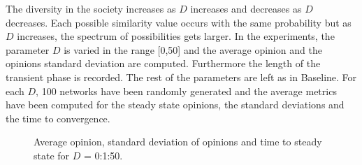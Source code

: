 The diversity in the society increases as $D$ increases and decreases as $D$ decreases. Each possible similarity value occurs with the same probability but as $D$ increases, the spectrum of possibilities gets larger. \newline
In the experiments, the parameter $D$ is varied in the range [0,50] and the average opinion and the opinions standard deviation are computed. Furthermore the length of the transient phase is recorded. The rest of the parameters are left as in Baseline. For each $D$, 100 networks have been randomly generated and the average metrics have been computed for the steady state opinions, the standard deviations and the time to convergence. 

\begin{figure}[!t]
	\centering
	\hfill
	\par 
	\caption{Average opinion, standard deviation of opinions and time to steady state for $D$ = 0:1:50.}
	\label{pics:diversityresults}
\end{figure}
